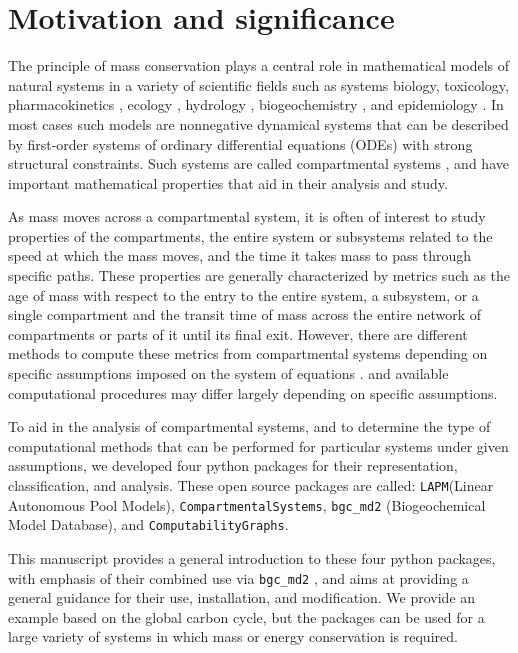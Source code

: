 \documentclass[a4paper]{article}
\newcommand{\LAPM}{\texttt{LAPM}}
\newcommand{\CompartmentalSystems}{\texttt{CompartmentalSystems}}
\begin{document}
\section{Motivation and significance}
The principle of mass conservation plays a central role in mathematical models
of natural systems in a variety of scientific fields such as systems biology,
toxicology, pharmacokinetics \citep{Anderson1983}, ecology
\citep{Eriksson1971ARoEaS, Rodhe1979Tellus, Matis1979, Manzoni2009SBB},
hydrology \citep{Nash1957IASH, Botter2011GRL, Harman2014GRL}, biogeochemistry
\citep{Manzoni2009SBB, Sierra2015EM}, and epidemiology \citep{Jacquez1993SIAM}.
In most cases such models are nonnegative dynamical systems that can be
described by first-order systems of ordinary differential equations (ODEs) with
strong structural constraints.  Such systems are called compartmental systems
\citep{Anderson1983, Jacquez1993SIAM, Walter1999, Haddad2010}, and have
important mathematical properties that aid in their analysis and study.

As mass moves across a compartmental system, it is often of interest to study
properties of the compartments, the entire system or subsystems related to the speed at
which the mass moves, and the time it takes mass to pass through specific
paths. These properties are generally characterized
by metrics such as the age of mass with respect to the entry to the entire
system, a subsystem, or a single compartment and the transit time of mass 
across the entire network of compartments or parts of it until its
final exit. 
However, there are different methods to compute these metrics from
compartmental systems depending on specific assumptions imposed on the system
of equations \citep{Sierra2017GCB}. and available computational
procedures may differ largely depending on specific assumptions.

To aid in the analysis of compartmental systems, and to determine the type of
computational methods that can be performed for particular systems under given
assumptions, we developed four python packages for their representation,
classification, and analysis. These open source packages are called: 
\LAPM (Linear Autonomous Pool Models),
\CompartmentalSystems, 
\texttt{bgc\_md2} (Biogeochemical Model Database), and
\texttt{ComputabilityGraphs}.

This manuscript provides a general introduction to these four python packages,
with emphasis of their combined use via \texttt{bgc\_md2} ,
and aims at providing a general guidance for their use, installation, and
modification. 
We provide an example based on the global carbon cycle, but the
packages can be used for a large variety of systems in which mass or energy
conservation is required.
\end{document}
